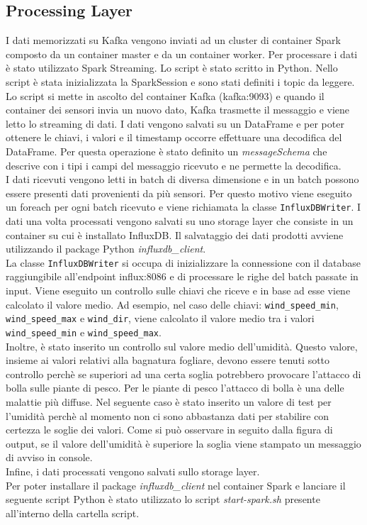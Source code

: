 \documentclass{article}
\begin{document}
\subsection{Processing Layer}
I dati memorizzati su Kafka vengono inviati ad un cluster di container Spark composto da un container master e da un container worker. Per processare i dati è stato utilizzato Spark Streaming. Lo script è stato scritto in Python. Nello script è stata inizializzata la SparkSession e sono stati definiti i topic da leggere. Lo script si mette in ascolto del container Kafka (kafka:9093) e quando il container dei sensori invia un nuovo dato, Kafka trasmette il messaggio e viene letto lo streaming di dati. I dati vengono salvati su un DataFrame e per poter ottenere le chiavi, i valori e il timestamp occorre effettuare una decodifica del DataFrame. Per questa operazione è stato definito un \textit{messageSchema} che descrive con i tipi i campi del messaggio ricevuto e ne permette la decodifica.\\
I dati ricevuti vengono letti in batch di diversa dimensione e in un batch possono essere presenti dati provenienti da più sensori. Per questo motivo viene eseguito un foreach per ogni batch ricevuto e viene richiamata la classe \texttt{InfluxDBWriter}. I dati una volta processati vengono salvati su uno storage layer che consiste in un container su cui è installato InfluxDB. Il salvataggio dei dati prodotti avviene utilizzando il package Python \textit{influxdb\_client}.\\ 
La classe \texttt{InfluxDBWriter} si occupa di inizializzare la connessione con il database raggiungibile all'endpoint influx:8086 e di processare le righe del batch passate in input. Viene eseguito un controllo sulle chiavi che riceve e in base ad esse viene calcolato il valore medio. Ad esempio, nel caso delle chiavi: \texttt{wind\_speed\_min}, \texttt{wind\_speed\_max} e \texttt{wind\_dir}, viene calcolato il valore medio tra i valori \texttt{wind\_speed\_min} e \texttt{wind\_speed\_max}.\\
Inoltre, è stato inserito un controllo sul valore medio dell'umidità. Questo valore, insieme ai valori relativi alla bagnatura fogliare, devono essere tenuti sotto controllo perchè se superiori ad una certa soglia potrebbero provocare l'attacco di bolla sulle piante di pesco. Per le piante di pesco l'attacco di bolla è una delle malattie più diffuse. Nel seguente caso è stato inserito un valore di test per l'umidità perchè al momento non ci sono abbastanza dati per stabilire con certezza le soglie dei valori.
Come si può osservare in seguito dalla figura di output, se il valore dell'umidità è superiore la soglia viene stampato un messaggio di avviso in console. \\
Infine, i dati processati vengono salvati sullo storage layer.\\
Per poter installare il package \textit{influxdb\_client} nel container Spark e lanciare il seguente script Python è stato utilizzato lo script \textit{start-spark.sh} presente all'interno della cartella script.
\end{document}
